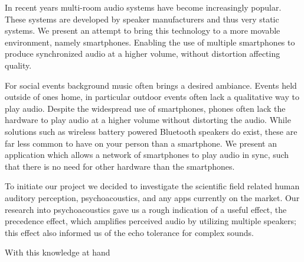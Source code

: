 In recent years multi-room audio systems have become increasingly popular.
These systems are developed by speaker manufacturers and thus very static systems.
We present an attempt to bring this technology to a more movable environment, namely smartphones.
Enabling the use of multiple smartphones to produce synchronized audio at a higher volume, without distortion affecting quality.

For social events background music often brings a desired ambiance.
Events held outside of ones home, in particular outdoor events often lack a qualitative way to play audio.
Despite the widespread use of smartphones, phones often lack the hardware to play audio at a higher volume without distorting the audio. 
While solutions such as wireless battery powered Bluetooth speakers do exist, these are far less common to have on your person than a smartphone.
We present an application which allows a network of smartphones to play audio in sync, such that there is no need for other hardware than the smartphones.

\bigskip \noindent
To initiate our project we decided to investigate the scientific field related human auditory perception, psychoacoustics, and any apps currently on the market.
Our research into psychoacoustics gave us a rough indication of a useful effect, the precedence effect, which amplifies perceived audio by utilizing multiple speakers; this effect also informed us of the echo tolerance for complex sounds.

With this knowledge at hand 



\bigskip \noindent

\bigskip \noindent


